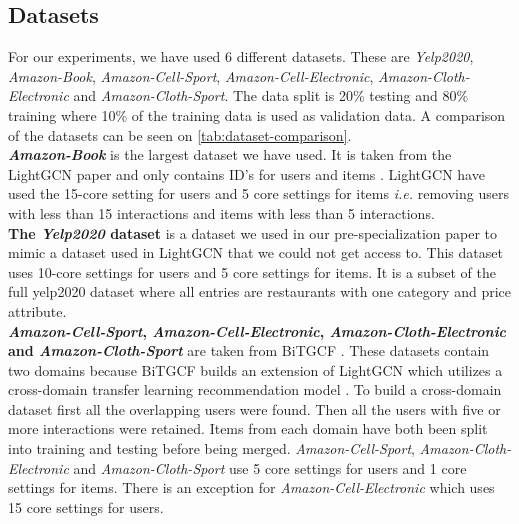 \subsection{Datasets}
For our experiments, we have used 6 different datasets.
These are \textit{Yelp2020}, \textit{Amazon-Book}, \textit{Amazon-Cell-Sport}, \textit{Amazon-Cell-Electronic}, \textit{Amazon-Cloth-Electronic} and \textit{Amazon-Cloth-Sport}.
The data split is 20\% testing and 80\% training where 10\% of the training data is used as validation data.
A comparison of the datasets can be seen on \autoref{tab:dataset-comparison}.
\\
\textbf{\textit{Amazon-Book}} is the largest dataset we have used.
It is taken from the LightGCN paper and only contains ID's for users and items \cite{lightgcn}.
LightGCN have used the 15-core setting for users and 5 core settings for items \textit{i.e.} removing users with less than 15 interactions and items with less than 5 interactions.
\\
\textbf{The \textit{Yelp2020} dataset} is a dataset we used in our pre-specialization paper to mimic a dataset used in LightGCN that we could not get access to.
This dataset uses 10-core settings for users and 5 core settings for items.
It is a subset of the full yelp2020 dataset where all entries are restaurants with one category and price attribute.
\\
\textbf{\textit{Amazon-Cell-Sport}, \textit{Amazon-Cell-Electronic}, \textit{Amazon-Cloth-Electronic} and \textit{Amazon-Cloth-Sport}} are taken from BiTGCF \cite{BiTGCF}.
These datasets contain two domains because BiTGCF builds an extension of LightGCN which utilizes a cross-domain transfer learning recommendation model \cite{BiTGCF}.
To build a cross-domain dataset first all the overlapping users were found.
Then all the users with five or more interactions were retained.
Items from each domain have both been split into training and testing before being merged.
\textit{Amazon-Cell-Sport}, \textit{Amazon-Cloth-Electronic} and \textit{Amazon-Cloth-Sport} use 5 core settings for users and 1 core settings for items.
There is an exception for \textit{Amazon-Cell-Electronic} which uses 15 core settings for users.
